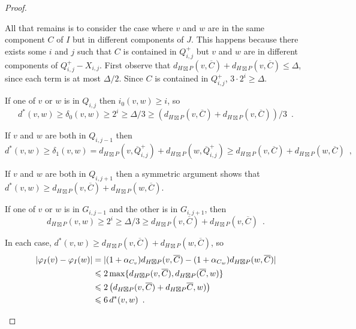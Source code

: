 \documentclass{patmorin}
\renewcommand{\ge}{\geqslant}
\renewcommand{\le}{\leqslant}
\begin{document}
\begin{proof}
\begin{compactenum}
    \item All that remains is to consider the case where $v$ and $w$ are in the same component $C$ of $I$ but in different components of $J$.  This happens because there exists some $i$ and $j$ such that $C$ is contained in $Q^+_{i,j}$ but $v$ and $w$ are in different components of $Q^+_{i,j}-X_{i,j}$.  First observe that $d_{H\boxtimes P}(v,\overline{C})+d_{H\boxtimes P}(v,\overline{C})\le \Delta$, since each term is at most $\Delta/2$.  Since $C$ is contained in $Q^+_{i,j}$, $3\cdot 2^{i} \ge \Delta$.
    \begin{compactenum}[(a)]
      \item If one of $v$ or $w$ is in $Q_{i,j}$ then $i_0(v,w)\ge i$, so
      \[
        d^*(v,w)\ge \delta_0(v,w)\ge 2^i\ge \Delta/3 \ge (d_{H\boxtimes P}(v,\overline{C})+d_{H\boxtimes P}(v,\overline{C}))/3 \enspace .
      \]
      \item If $v$ and $w$ are both in $Q_{i,j-1}$ then
      \[
        d^*(v,w) \ge \delta_1(v,w)=d_{H\boxtimes P}(v,\overline{Q}^+_{i,j}) + d_{H\boxtimes P}(w,\overline{Q}^+_{i,j})\ge d_{H\boxtimes P}(v,\overline{C})+d_{H\boxtimes P}(w,\overline{C}) \enspace ,
      \]

      \item If $v$ and $w$ are both in $Q_{i,j+1}$ then a symmetric argument shows that $d^*(v,w)\ge d_{H\boxtimes P}(v,\overline{C})+d_{H\boxtimes P}(w,\overline{C})$.

      \item If one of $v$ or $w$ is in $G_{i,j-1}$ and the other is in $G_{i,j+1}$, then
      \[
        d_{H\boxtimes P}(v,w)\ge 2^i\ge\Delta/3\ge d_{H\boxtimes P}(v,\overline{C})+d_{H\boxtimes P}(v,\overline{C}) \enspace .
      \]
    \end{compactenum}
    In each case, $d^*(v,w)\ge d_{H\boxtimes P}(v,\overline{C})+d_{H\boxtimes P}(w,\overline{C})$, so
    \begin{align*}
        |\varphi_I(v)-\varphi_I(w)|
        & =|(1+\alpha_{C_v})d_{H\boxtimes P}(v,\overline{C})-(1+\alpha_{C_w})d_{H\boxtimes P}(w,\overline{C})| \\
        & \le 2\max\{d_{H\boxtimes P}(v,\overline{C}), d_{H\boxtimes P}(\overline{C},w)\} \\
        & \le 2\left(d_{H\boxtimes P}(v,\overline{C}) + d_{H\boxtimes P}\overline{C},w)\right) \\
        & \le 6\, d^*(v,w) \enspace . \qedhere
    \end{align*}
  \end{compactenum}
\end{proof}
\end{document}
